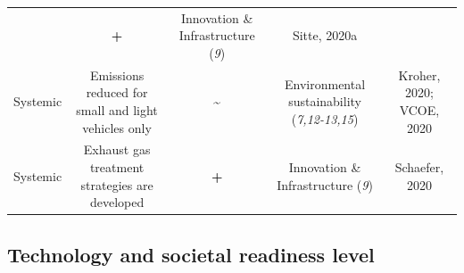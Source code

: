 \documentclass[
]{book}
\begin{document}
\begin{longtable}[]{@{}ccccc@{}}
\begin{minipage}[t]{0.16\columnwidth}
\end{minipage} & \begin{minipage}[t]{0.17\columnwidth}\centering
\textbf{+}\strut
\end{minipage} & \begin{minipage}[t]{0.17\columnwidth}\centering
Innovation \& Infrastructure (\emph{9})\strut
\end{minipage} & \begin{minipage}[t]{0.17\columnwidth}\centering
Sitte, 2020a\strut
\end{minipage}\tabularnewline
\begin{minipage}[t]{0.17\columnwidth}\centering
Systemic\strut
\end{minipage} & \begin{minipage}[t]{0.16\columnwidth}\centering
Emissions reduced for small and light vehicles only\strut
\end{minipage} & \begin{minipage}[t]{0.17\columnwidth}\centering
\textbf{\textasciitilde{}}\strut
\end{minipage} & \begin{minipage}[t]{0.17\columnwidth}\centering
Environmental sustainability (\emph{7,12-13,15})\strut
\end{minipage} & \begin{minipage}[t]{0.17\columnwidth}\centering
Kroher, 2020; VCOE, 2020\strut
\end{minipage}\tabularnewline
\begin{minipage}[t]{0.17\columnwidth}\centering
Systemic\strut
\end{minipage} & \begin{minipage}[t]{0.16\columnwidth}\centering
Exhaust gas treatment strategies are developed\strut
\end{minipage} & \begin{minipage}[t]{0.17\columnwidth}\centering
\textbf{+}\strut
\end{minipage} & \begin{minipage}[t]{0.17\columnwidth}\centering
Innovation \& Infrastructure (\emph{9})\strut
\end{minipage} & \begin{minipage}[t]{0.17\columnwidth}\centering
Schaefer, 2020\strut
\end{minipage}\tabularnewline
\bottomrule
\end{longtable}

\hypertarget{technology-and-societal-readiness-level-14}{%
\subsection*{Technology and societal readiness level}\label{technology-and-societal-readiness-level-14}}
\end{document}

